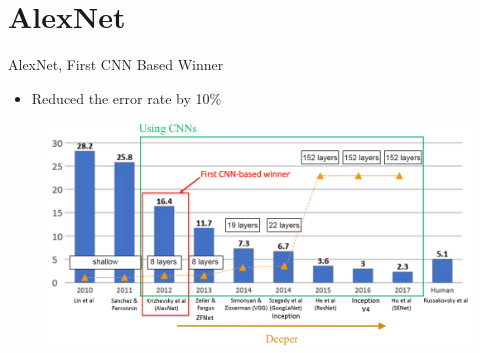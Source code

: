 \documentclass[serif, aspectratio=169]{beamer}
\begin{document}
\section{AlexNet}
\begin{frame}{AlexNet, First CNN Based Winner}
	\begin{itemize}
		\item Reduced the error rate by 10\%
	\end{itemize}
	\begin{figure}[htpb]
		\begin{center}
			\includegraphics[keepaspectratio, scale=0.25]{pic/imagenet}
		\end{center}
	\end{figure}
\end{frame}
\end{document}
